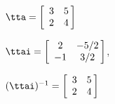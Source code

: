 {$\tta = \left[
\begin{array}{cc}
  3 & 5\\
  2 & 4
\end{array}\hskip -3pt \right]$
}
{$\ttai = \left[
\begin{array}{cc}
2 & -5/2\\
-1 & 3/2
\end{array} \hskip -3pt
\right]$,

$(\ttai)^{-1} = \left[
\begin{array}{cc}
3 & 5\\
  2 & 4
  \end{array}\hskip -3pt \right]$
}
